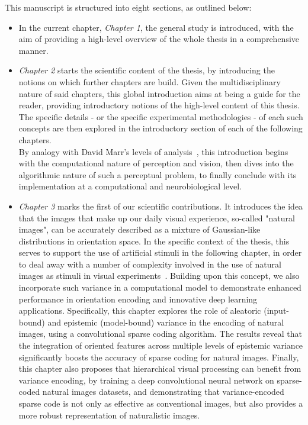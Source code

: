 This manuscript is structured into eight sections, as outlined below: 
\begin{itemize} 

\item In the current chapter, \textit{Chapter 1}, the general study is introduced, with the aim of providing a high-level overview of the whole thesis in a comprehensive manner.

\item \textit{Chapter 2} starts the scientific content of the thesis, by introducing the notions on which further chapters are build. Given the multidisciplinary nature of said chapters, this global introduction aims at being a guide for the reader, providing introductory notions of the high-level content of this thesis. The specific details - or the specific experimental methodologies - of each such concepts are then explored in the introductory section of each of the following chapters. \\
By analogy with David Marr's levels of analysis~\cite{marr1982vision}, this introduction begins with the computational nature of perception and vision, then dives into the algorithmic nature of such a perceptual problem, to finally conclude with its implementation at a computational and neurobiological level.

\item \textit{Chapter 3} marks the first of our scientific contributions. It introduces the idea that the images that make up our daily visual experience, so-called "natural images", can be accurately described as a mixture of Gaussian-like distributions in orientation space. In the specific context of the thesis, this serves to support the use of artificial stimuli in the following chapter, in order to deal away with a number of complexity involved in the use of natural images as stimuli in visual experiments~\cite{rust2005praise}. Building upon this concept, we also incorporate such variance in a computational model to demonstrate enhanced performance in orientation encoding and innovative deep learning applications. Specifically, this chapter explores the role of aleatoric (input-bound) and epistemic (model-bound) variance in the encoding of natural images, using a convolutional sparse coding algorithm. The results reveal that the integration of oriented features across multiple levels of epistemic variance significantly boosts the accuracy of sparse coding for natural images. Finally, this chapter also proposes that hierarchical visual processing can benefit from variance encoding, by training a deep convolutional neural network on sparse-coded natural images datasets, and demonstrating that variance-encoded sparse code is not only as effective as conventional images, but also provides a more robust representation of naturalistic images.


\end{itemize}
